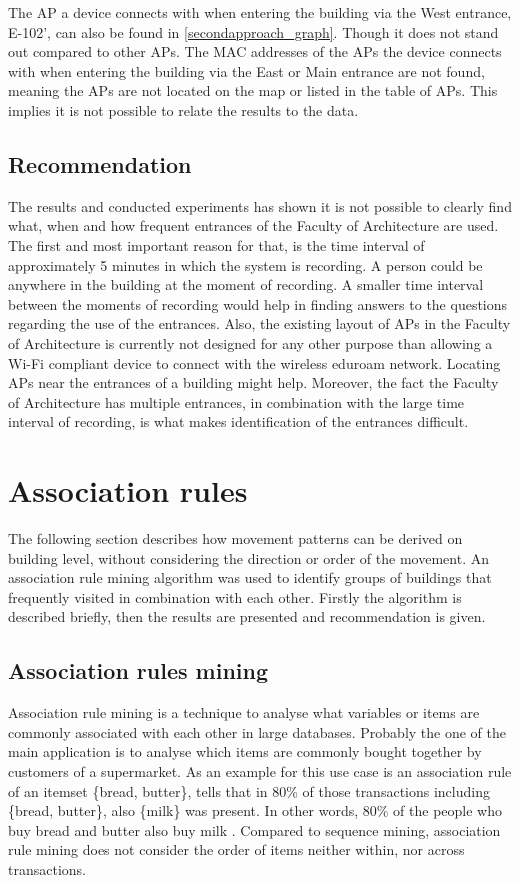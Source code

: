 The AP a device connects with when entering the building via the West entrance, E-102', can also be found in \autoref{secondapproach_graph}. Though it does not stand out compared to other APs. The MAC addresses of the APs the device connects with when entering the building via the East or Main entrance are not found, meaning the APs are not located on the map or listed in the table of APs. This implies it is not possible to relate the results to the data. 
\subsection{Recommendation}
The results and conducted experiments has shown it is not possible to clearly find what, when and how frequent entrances of the Faculty of Architecture are used. The first and most important reason for that, is the time interval of approximately 5 minutes in which the system is recording. A person could be anywhere in the building at the moment of recording. A smaller time interval between the moments of recording would help in finding answers to the questions regarding the use of the entrances. Also, the existing layout of APs in the Faculty of Architecture is currently not designed for any other purpose than allowing a Wi-Fi compliant device to connect with the wireless eduroam network. Locating APs near the entrances of a building might help. Moreover, the fact the Faculty of Architecture has multiple entrances, in combination with the large time interval of recording, is what makes identification of the entrances difficult. 

\section{Association rules} 
The following section describes how movement patterns can be derived on building
level, without considering the direction or order of the movement. An
association rule mining algorithm \parencite{agrawal_mining_1993} was used to
identify groups of buildings that frequently visited in combination with each
other. Firstly the algorithm is described briefly, then the results are
presented and recommendation is given.

\subsection{Association rules mining}
Association rule mining is a technique to analyse what variables or items are
commonly associated with each other in large databases. Probably the one of the
main application is to analyse which items are commonly bought together by
customers of a supermarket. As an example for this use case is an association
rule of an itemset \{bread, butter\}, tells that in 80\% of those transactions
including \{bread, butter\}, also \{milk\}  was present. In other words, 80\%
of the people who buy bread and butter also buy milk
\parencite{agrawal_mining_1993}. Compared to sequence mining, association rule
mining does not consider the order of items neither within, nor across transactions.

